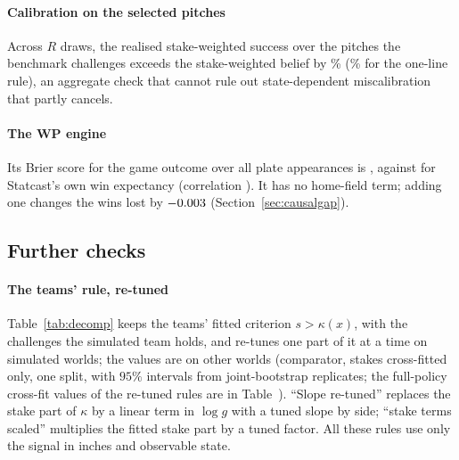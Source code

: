 \documentclass[aoas]{imsart}
\theoremstyle{plain}
\theoremstyle{definition}
\begin{document}
\paragraph{Calibration on the selected pitches} Across $R$ draws, the realised stake-weighted success over the pitches
the benchmark challenges exceeds the stake-weighted belief by \SelCalOpt\% (\SelCalRule\% for the one-line rule), an
aggregate check that cannot rule out state-dependent miscalibration that partly cancels.

\paragraph{The WP engine} Its Brier score for the game outcome over all plate appearances is \SWPBrier, against
\SWPBrierSC{} for Statcast's own win expectancy (correlation \SWPCorr). It has no home-field term; adding one changes the
wins lost by $-0.003$ (Section~\ref{sec:causalgap}).

\subsection{Further checks}\label{sec:further}
\paragraph{The teams' rule, re-tuned} Table~\ref{tab:decomp} keeps the teams' fitted criterion $s>\kappa(x)$, with the
challenges the simulated team holds, and re-tunes one part of it at a time on \DecRTune{} simulated worlds; the values
are on \DecRTune{} other worlds (comparator, stakes cross-fitted only, one split, with $95\%$ intervals from \MechB{} joint-bootstrap replicates; the
full-policy cross-fit values of the re-tuned rules are in Table~). ``Slope re-tuned'' replaces the stake part of $\kappa$ by a linear term in $\log g$
with a tuned slope by side; ``stake terms scaled'' multiplies the fitted stake part by a tuned factor. All these rules
use only the signal in inches and observable state.
\begin{table}[!htbp]
\caption{Re-tuning the teams' fitted rule, wins per team-season, out of the tuning sample (comparator). Gap closed:
share of the gap between observed play and the benchmark.}\label{tab:decomp}
\centering\small
\resizebox{\textwidth}{!}{}
\end{table}
\end{document}
